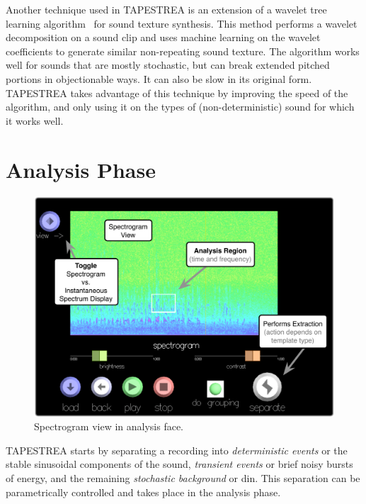 \documentclass[10pt,letterpaper]{article}
\begin{document}
Another technique used in TAPESTREA is an extension of a wavelet tree
learning algorithm~ for sound texture synthesis. This
method performs a wavelet decomposition on a sound clip and uses machine
learning on the wavelet coefficients to generate similar non-repeating sound
texture. The algorithm works well for sounds that are mostly stochastic, but
can break extended pitched portions in objectionable ways. It can also be 
slow in its original form. TAPESTREA takes advantage of this technique by 
improving the speed of the algorithm, and only using it on the types of 
(non-deterministic) sound for which it works well.

\section{Analysis Phase}

\begin{figure}[h]
  \begin{center}
    \includegraphics[width=.95\columnwidth]{ui_specgram.pdf}
    \caption{Spectrogram view in analysis face.} 
    \label{fig:ui_specgram}
  \end{center}
\end{figure}

TAPESTREA starts by separating a recording into \textit{deterministic
events} or the stable sinusoidal components of the
sound, \textit{transient events} or brief noisy bursts of energy, and the
remaining \textit{stochastic background} or din. This separation can
be parametrically controlled and takes place in the analysis
phase. 
\end{document}
